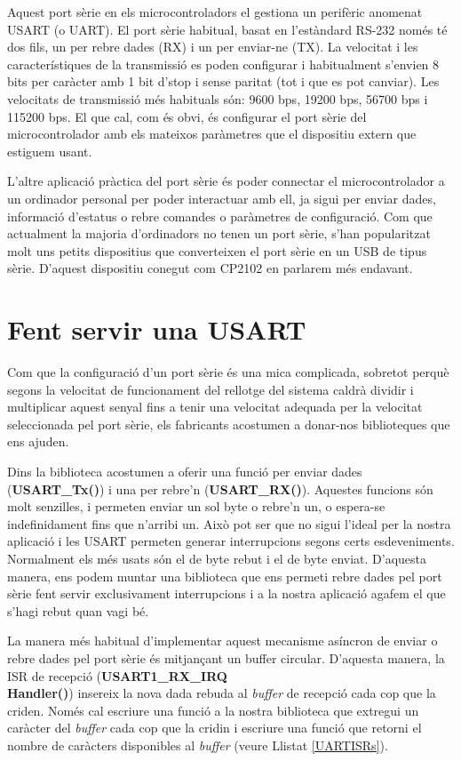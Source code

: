 Aquest port sèrie en els microcontroladors el gestiona un perifèric anomenat \gls{USART} (o \gls{UART}). El port sèrie habitual, basat en l'estàndard RS-232 només té dos fils, un per rebre dades (RX) i un per enviar-ne (TX). La velocitat i les característiques de la transmissió es poden configurar i habitualment s'envien 8 bits per caràcter amb 1 bit d'stop i sense paritat (tot i que es pot canviar). Les velocitats de transmissió més habituals són: 9600 \gls{bps}, 19200 bps, 56700 bps i 115200 bps. El que cal, com és obvi, és configurar el port sèrie del microcontrolador amb els mateixos paràmetres que el dispositiu extern que estiguem usant.

L'altre aplicació pràctica del port sèrie és poder connectar el microcontrolador a un ordinador personal per poder interactuar amb ell, ja sigui per enviar dades, informació d'estatus o rebre comandes o paràmetres de configuració. Com que actualment la majoria d'ordinadors no tenen un port sèrie, s'han popularitzat molt uns petits dispositius que converteixen el port sèrie en un \gls{USB} de tipus sèrie. D'aquest dispositiu conegut com \gls{CP2102} en parlarem més endavant.

\section{Fent servir una USART}
Com que la configuració d'un port sèrie és una mica complicada, sobretot perquè segons la velocitat de funcionament del rellotge del sistema caldrà dividir i multiplicar aquest senyal fins a tenir una velocitat adequada per la velocitat seleccionada pel port sèrie, els fabricants acostumen a donar-nos biblioteques que ens ajuden.

Dins la biblioteca acostumen a oferir una funció per enviar dades ({\bf USART\_Tx()}) i una per rebre'n ({\bf USART\_RX()}). Aquestes funcions són molt senzilles, i permeten enviar un sol byte o rebre'n un, o espera-se indefinidament fins que n'arribi un. Això pot ser que no sigui l'ideal per la nostra aplicació i les \gls{USART} permeten generar interrupcions segons certs esdeveniments. Normalment els més usats són el de byte rebut i el de byte enviat. D'aquesta manera, ens podem muntar una biblioteca que ens permeti rebre dades pel port sèrie fent servir exclusivament interrupcions i a la nostra aplicació agafem el que s'hagi rebut quan vagi bé.

La manera més habitual d'implementar aquest mecanisme asíncron de enviar o rebre dades pel port sèrie és mitjançant un \gls{buffer circular}. D'aquesta manera, la \gls{ISR} de recepció ({\bf USART1\_RX\_IRQ\\Handler()}) insereix la nova dada rebuda al {\em buffer} de recepció cada cop que la criden. Només cal escriure una funció a la nostra biblioteca que extregui un caràcter del {\em buffer} cada cop que la cridin i escriure una funció que retorni el nombre de caràcters disponibles al {\em buffer} (veure Llistat \ref{UARTISRs}).

